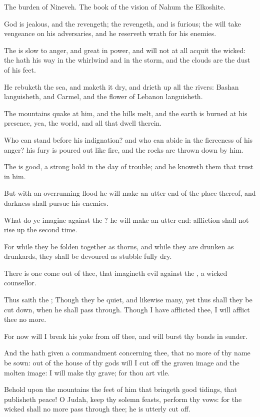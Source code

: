 \Chapter
\Verse The burden of Nineveh. The book of the vision of Nahum the Elkoshite.

\Verse God is jealous, and the \LORD revengeth; the \LORD revengeth, and is furious; the \LORD will take vengeance on his adversaries, and he reserveth wrath for his enemies.

\Verse The \LORD is slow to anger, and great in power, and will not at all acquit the wicked: the \LORD hath his way in the whirlwind and in the storm, and the clouds are the dust of his feet.

\Verse He rebuketh the sea, and maketh it dry, and drieth up all the rivers: Bashan languisheth, and Carmel, and the flower of Lebanon languisheth.

\Verse The mountains quake at him, and the hills melt, and the earth is burned at his presence, yea, the world, and all that dwell therein.

\Verse Who can stand before his indignation? and who can abide in the fierceness of his anger? his fury is poured out like fire, and the rocks are thrown down by him.

\Verse The \LORD is good, a strong hold in the day of trouble; and he knoweth them that trust in him.

\Verse But with an overrunning flood he will make an utter end of the place thereof, and darkness shall pursue his enemies.

\Verse What do ye imagine against the \LORD? he will make an utter end: affliction shall not rise up the second time.

\Verse For while they be folden together as thorns, and while they are drunken as drunkards, they shall be devoured as stubble fully dry.

\Verse There is one come out of thee, that imagineth evil against the \LORD, a wicked counsellor.

\Verse Thus saith the \LORD; Though they be quiet, and likewise many, yet thus shall they be cut down, when he shall pass through. Though I have afflicted thee, I will afflict thee no more.

\Verse For now will I break his yoke from off thee, and will burst thy bonds in sunder.

\Verse And the \LORD hath given a commandment concerning thee, that no more of thy name be sown: out of the house of thy gods will I cut off the graven image and the molten image: I will make thy grave; for thou art vile.

\Verse Behold upon the mountains the feet of him that bringeth good tidings, that publisheth peace! O Judah, keep thy solemn feasts, perform thy vows: for the wicked shall no more pass through thee; he is utterly cut off.


